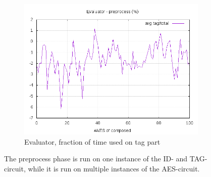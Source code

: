 \documentclass[10pt,a4paper]{article}
\begin{document}
\begin{figure}[h]
\begin{subfigure}[t]{0.3\textwidth}
        \includegraphics[width=\textwidth]{eval_preprocess_frac}
        \caption{Evaluator, fraction of time used on tag part}
    \end{subfigure}
    \caption{The preprocess phase is run on one instance of the ID- and TAG-circuit, while it is run on multiple instances of the AES-circuit.}
    \label{data preprocess}
\end{figure}
\end{document}
